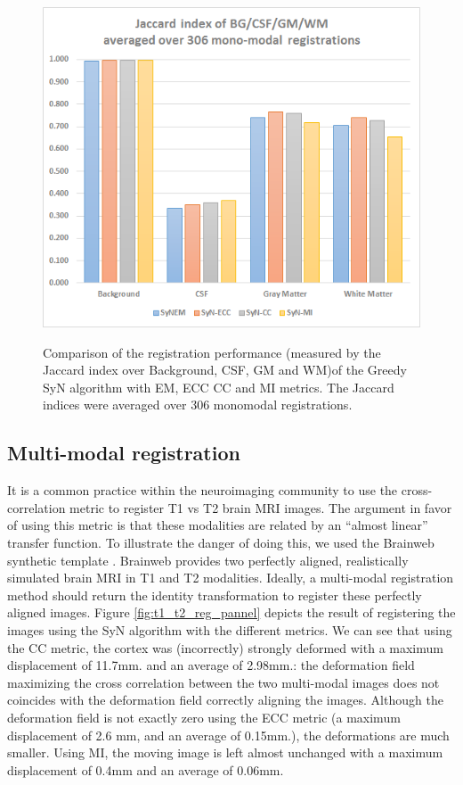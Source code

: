 \begin{figure}[H]
\centering
\includegraphics[width=0.5\linewidth]{./images/mono_graph_segTri_fill.png}\\
\caption{Comparison of the registration performance (measured by the Jaccard index over Background, CSF, GM and WM)of the Greedy SyN algorithm with EM, ECC CC and MI metrics. The Jaccard
indices were averaged over 306 monomodal registrations.}
\label{fig:mono_graph_segTri_fill}
\end{figure}


\subsection{Multi-modal registration}
It is a common practice within the neuroimaging community to use the cross-correlation metric to register T1 vs T2 brain MRI images. The argument in favor of using
this metric is that these modalities are related by an ``almost linear'' transfer function. To illustrate the danger of doing this, we used the Brainweb synthetic
template \cite{Cocosco1997}\cite{Kwan1999}. Brainweb provides two perfectly aligned, realistically simulated brain MRI in T1 and T2 modalities. Ideally, a multi-modal
registration method should return the identity transformation to register these perfectly aligned images.
Figure \ref{fig:t1_t2_reg_pannel} depicts the result of registering the images using the SyN algorithm with the different metrics. We can see that using the CC metric,
the cortex was (incorrectly) strongly deformed with a maximum displacement of 11.7mm. and an average of 2.98mm.: the deformation field maximizing the cross correlation between the two multi-modal images does not coincides with the deformation field
correctly aligning the images. Although the deformation field is not exactly zero using the ECC metric (a maximum displacement of 2.6 mm, and an average of 0.15mm.), the deformations
are much smaller. Using MI, the moving image is left almost unchanged with a maximum displacement of 0.4mm and an average of 0.06mm.



